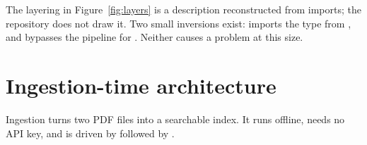 \begin{inferred}
The layering in Figure~\ref{fig:layers} is a description reconstructed from imports; the repository does not draw it. Two small inversions exist:  imports the  type from , and  bypasses the pipeline for . Neither causes a problem at this size.
\end{inferred}

\section{Ingestion-time architecture}
\label{sec:arch-ingest}

Ingestion turns two PDF files into a searchable index. It runs offline, needs no API key, and is driven by  followed by .

